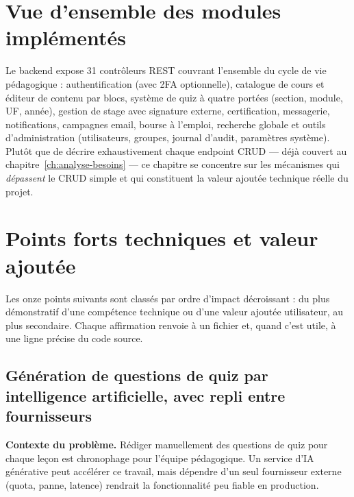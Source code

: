 \section{Vue d'ensemble des modules implémentés}

Le backend expose 31 contrôleurs REST couvrant l'ensemble du cycle de vie
pédagogique : authentification (avec 2FA optionnelle), catalogue de cours
et éditeur de contenu par blocs, système de quiz à quatre portées
(section, module, UF, année), gestion de stage avec signature externe,
certification, messagerie, notifications, campagnes email, bourse à
l'emploi, recherche globale et outils d'administration (utilisateurs,
groupes, journal d'audit, paramètres système). Plutôt que de décrire
exhaustivement chaque endpoint CRUD --- déjà couvert au
chapitre~\ref{ch:analyse-besoins} --- ce chapitre se concentre sur les
mécanismes qui \emph{dépassent} le CRUD simple et qui constituent la
valeur ajoutée technique réelle du projet.

\section{Points forts techniques et valeur ajoutée}
\label{sec:points-forts}

Les onze points suivants sont classés par ordre d'impact décroissant :
du plus démonstratif d'une compétence technique ou d'une valeur ajoutée
utilisateur, au plus secondaire. Chaque affirmation renvoie à un fichier
et, quand c'est utile, à une ligne précise du code source.

\subsection{Génération de questions de quiz par intelligence artificielle, avec repli entre fournisseurs}
\label{sec:generation-ia}

\textbf{Contexte du problème.} Rédiger manuellement des questions de quiz
pour chaque leçon est chronophage pour l'équipe pédagogique. Un service
d'IA générative peut accélérer ce travail, mais dépendre d'un seul
fournisseur externe (quota, panne, latence) rendrait la fonctionnalité peu
fiable en production.

